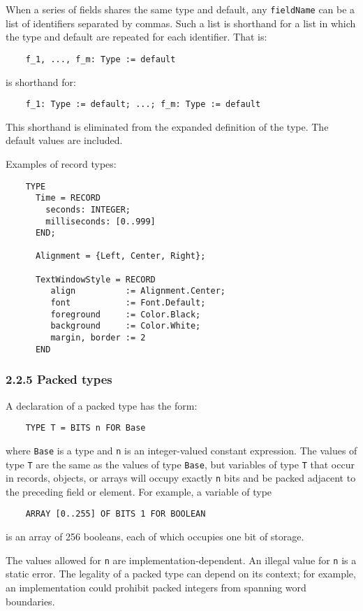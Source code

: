 \documentclass[10pt]{article}
\begin{document}
When a series of fields shares the same type and default, any \verb|fieldName|
can be a list of identifiers separated by commas.  Such a list is shorthand
for a list in which the type and default are repeated for each identifier.
That is:
\begin{verbatim}
    f_1, ..., f_m: Type := default
\end{verbatim}
is shorthand for:
\begin{verbatim}
    f_1: Type := default; ...; f_m: Type := default
\end{verbatim}
This shorthand is eliminated from the expanded definition of the type.  The
default values are included.

Examples of record types:
\begin{verbatim}
    TYPE
      Time = RECORD
        seconds: INTEGER;
        milliseconds: [0..999]
      END;

      Alignment = {Left, Center, Right};

      TextWindowStyle = RECORD
         align          := Alignment.Center;
         font           := Font.Default;
         foreground     := Color.Black;
         background     := Color.White;
         margin, border := 2
      END
\end{verbatim}

\subsubsection*{2.2.5 Packed types}

A declaration of a packed type has the form:
\begin{verbatim}
    TYPE T = BITS n FOR Base
\end{verbatim}
where \verb|Base| is a type and \verb|n| is an integer-valued constant
expression.  The values of type \verb|T| are the same as the values of type
\verb|Base|, but variables of type \verb|T| that occur in records, objects, or
arrays will occupy exactly \verb|n| bits and be packed adjacent to the
preceding field or element.  For example, a variable of type
\begin{verbatim}
    ARRAY [0..255] OF BITS 1 FOR BOOLEAN
\end{verbatim}
is an array of 256 booleans, each of which occupies one bit of storage.

The values allowed for \verb|n| are implementation-dependent.  An illegal
value for \verb|n| is a static error.  The legality of a packed type can
depend on its context; for example, an implementation could prohibit packed
integers from spanning word boundaries.
\end{document}
